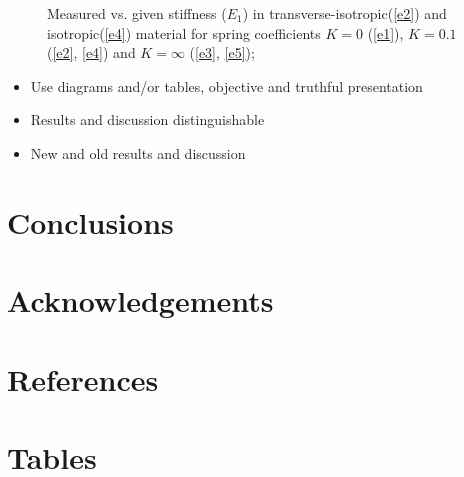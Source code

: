 \documentclass[review]{elsarticle}
\begin{document}
\begin{figure}[!ht]
\captionsetup{justification=centering}
\caption{Measured vs. given stiffness
($E_{1}$) in transverse-isotropic(\ref{e2}) and isotropic(\ref{e4}) material for
spring coefficients $K=0$ (\ref{e1}), $K=0.1$ (\ref{e2}, \ref{e4}) and
$K=\infty$ (\ref{e3}, \ref{e5});\\
\color{red}{a) total area of interest, b) chosen area of interest c)
experiment.}}


\end{figure}




\color{red}
\begin{itemize}
\item Use diagrams and/or tables, objective and truthful presentation
\item Results and discussion distinguishable
\item New and old results and discussion
\end{itemize}


\section{Conclusions}

\section*{Acknowledgements}

\section*{References}


\pagebreak

\section*{Tables}
\end{document}

